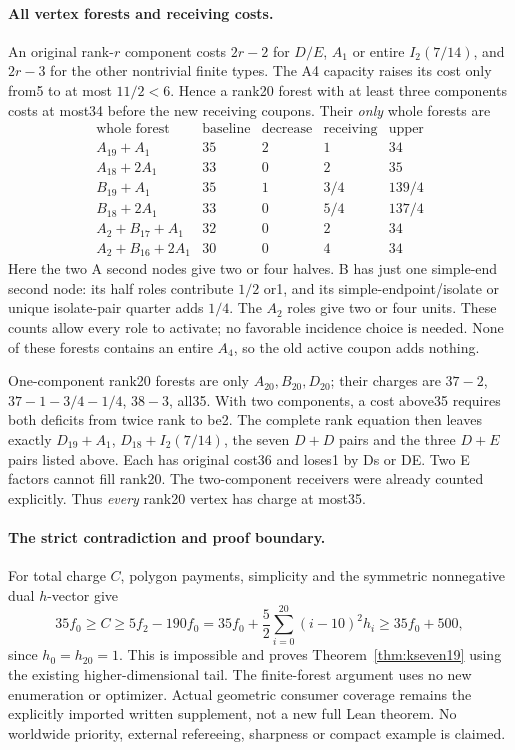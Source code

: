 \paragraph{All vertex forests and receiving costs.}
An original rank-$r$ component costs $2r-2$ for $D/E$, $A_1$ or
entire $I_2(7/14)$, and $2r-3$ for the other nontrivial finite types.
The A4 capacity raises its cost only from5 to at most $11/2<6$.
Hence a rank20 forest with at least three components costs at most34
before the new receiving coupons. Their \emph{only} whole forests are
\[
\begin{array}{c|rrrr}
 \text{whole forest}&\text{baseline}&\text{decrease}&\text{receiving}&\text{upper}\\\hline
 A_{19}+A_1&35&2&1&34\\
 A_{18}+2A_1&33&0&2&35\\
 B_{19}+A_1&35&1&3/4&139/4\\
 B_{18}+2A_1&33&0&5/4&137/4\\
 A_2+B_{17}+A_1&32&0&2&34\\
 A_2+B_{16}+2A_1&30&0&4&34
\end{array}
\]
Here the two A second nodes give two or four halves. B has just one
simple-end second node: its half roles contribute $1/2$ or1, and
its simple-endpoint/isolate or unique isolate-pair quarter adds $1/4$.
The $A_2$ roles give two or four units. These counts allow every role
to activate; no favorable incidence choice is needed. None of these
forests contains an entire $A_4$, so the old active coupon adds nothing.

One-component rank20 forests are only $A_{20},B_{20},D_{20}$;
their charges are $37-2$, $37-1-3/4-1/4$, $38-3$, all35.
With two components, a cost above35 requires both deficits from twice
rank to be2. The complete rank equation then leaves exactly
$D_{19}+A_1$, $D_{18}+I_2(7/14)$, the seven $D+D$ pairs and the
three $D+E$ pairs listed above. Each has original cost36 and loses1
by Ds or DE. Two E factors cannot fill rank20. The two-component
receivers were already counted explicitly. Thus \emph{every} rank20
vertex has charge at most35.

\paragraph{The strict contradiction and proof boundary.}
For total charge $C$, polygon payments, simplicity and the symmetric
nonnegative dual $h$-vector give
\[
 35f_0\ge C\ge5f_2-190f_0
 =35f_0+\frac52\sum_{i=0}^{20}(i-10)^2h_i
 \ge35f_0+500,
\]
since $h_0=h_{20}=1$. This is impossible and proves
Theorem~\ref{thm:kseven19} using the existing higher-dimensional tail.
The finite-forest argument uses no new enumeration or optimizer.
Actual geometric consumer coverage remains the explicitly imported
written supplement, not a new full Lean theorem. No worldwide priority,
external refereeing, sharpness or compact example is claimed.

